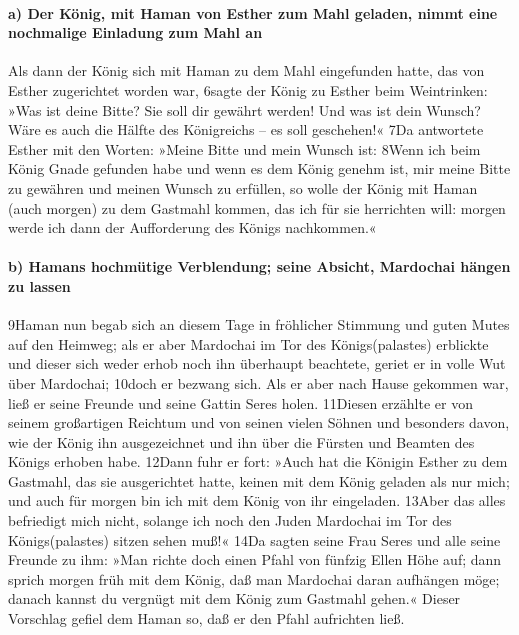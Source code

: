 \hypertarget{a-der-kuxf6nig-mit-haman-von-esther-zum-mahl-geladen-nimmt-eine-nochmalige-einladung-zum-mahl-an}{%
\paragraph{a) Der König, mit Haman von Esther zum Mahl geladen, nimmt
eine nochmalige Einladung zum Mahl
an}\label{a-der-kuxf6nig-mit-haman-von-esther-zum-mahl-geladen-nimmt-eine-nochmalige-einladung-zum-mahl-an}}

Als dann der König sich mit Haman zu dem Mahl eingefunden hatte, das von
Esther zugerichtet worden war, 6sagte der König zu Esther beim
Weintrinken: »Was ist deine Bitte? Sie soll dir gewährt werden! Und was
ist dein Wunsch? Wäre es auch die Hälfte des Königreichs -- es soll
geschehen!« 7Da antwortete Esther mit den Worten: »Meine Bitte und mein
Wunsch ist: 8Wenn ich beim König Gnade gefunden habe und wenn es dem
König genehm ist, mir meine Bitte zu gewähren und meinen Wunsch zu
erfüllen, so wolle der König mit Haman (auch morgen) zu dem Gastmahl
kommen, das ich für sie herrichten will: morgen werde ich dann der
Aufforderung des Königs nachkommen.«

\hypertarget{b-hamans-hochmuxfctige-verblendung-seine-absicht-mardochai-huxe4ngen-zu-lassen}{%
\paragraph{b) Hamans hochmütige Verblendung; seine Absicht, Mardochai
hängen zu
lassen}\label{b-hamans-hochmuxfctige-verblendung-seine-absicht-mardochai-huxe4ngen-zu-lassen}}

9Haman nun begab sich an diesem Tage in fröhlicher Stimmung und guten
Mutes auf den Heimweg; als er aber Mardochai im Tor des Königs(palastes)
erblickte und dieser sich weder erhob noch ihn überhaupt beachtete,
geriet er in volle Wut über Mardochai; 10doch er bezwang sich. Als er
aber nach Hause gekommen war, ließ er seine Freunde und seine Gattin
Seres holen. 11Diesen erzählte er von seinem großartigen Reichtum und
von seinen vielen Söhnen und besonders davon, wie der König ihn
ausgezeichnet und ihn über die Fürsten und Beamten des Königs erhoben
habe. 12Dann fuhr er fort: »Auch hat die Königin Esther zu dem Gastmahl,
das sie ausgerichtet hatte, keinen mit dem König geladen als nur mich;
und auch für morgen bin ich mit dem König von ihr eingeladen. 13Aber das
alles befriedigt mich nicht, solange ich noch den Juden Mardochai im Tor
des Königs(palastes) sitzen sehen muß!« 14Da sagten seine Frau Seres und
alle seine Freunde zu ihm: »Man richte doch einen Pfahl von fünfzig
Ellen Höhe auf; dann sprich morgen früh mit dem König, daß man Mardochai
daran aufhängen möge; danach kannst du vergnügt mit dem König zum
Gastmahl gehen.« Dieser Vorschlag gefiel dem Haman so, daß er den Pfahl
aufrichten ließ.

